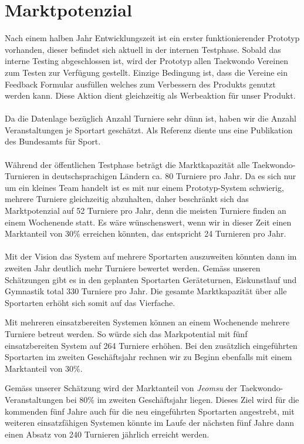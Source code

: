 \section{Marktpotenzial}\label{marktpotenzial}

Nach einem halben Jahr Entwicklungszeit ist ein erster funktionierender Prototyp vorhanden, dieser befindet sich aktuell in
der internen Testphase.
Sobald das interne Testing abgeschlossen ist, wird der Prototyp allen Taekwondo Vereinen zum Testen zur Verfügung gestellt.
Einzige Bedingung ist, dass die Vereine ein Feedback Formular ausfüllen welches zum Verbessern des Produkts genutzt werden kann.
Diese Aktion dient gleichzeitig als Werbeaktion für unser Produkt.
\\\\
Da die Datenlage bezüglich Anzahl Turniere sehr dünn ist, haben wir die Anzahl Veranstaltungen je Sportart geschätzt.
Als Referenz diente uns eine Publikation des Bundesamts für Sport. \parencite[S.~9]{baspo}
\\\\
Während der öffentlichen Testphase beträgt die Marktkapazität alle Taekwondo-Turnieren in deutschsprachigen Ländern
	ca. 80 Turniere pro Jahr.
Da es sich nur um ein kleines Team handelt ist es mit nur einem Prototyp-System schwierig, mehrere Turniere
	gleichzeitig abzuhalten, daher beschränkt sich das Marktpotenzial auf 52 Turniere pro Jahr, denn die meisten
	Turniere finden an einem Wochenende statt.
Es wäre wünschenswert, wenn wir in dieser Zeit einen Marktanteil von 30\% erreichen könnten, das entspricht 24
	Turnieren pro Jahr.
\\\\
Mit der Vision das System auf mehrere Sportarten auszuweiten könnten dann im zweiten Jahr deutlich mehr Turniere bewertet werden.
Gemäss unseren Schätzungen gibt es in den geplanten Sportarten Geräteturnen, Eiskunstlauf und Gymnastik total 330 Turniere pro Jahr.
Die gesamte Marktkapazität über alle Sportarten erhöht sich somit auf das Vierfache.

Mit mehreren einsatzbereiten Systemen können an einem Wochenende mehrere Turniere betreut werden.
So würde sich das Markpotential mit fünf einsatzbereiten System auf 264 Turniere erhöhen.
Bei den zusätzlich eingeführten Sportarten im zweiten Geschäftsjahr rechnen wir zu Beginn ebenfalls mit einem Marktanteil von 30\%.

Gemäss unserer Schätzung wird der Marktanteil von \textit{Jeomsu} der Taekwondo-Veranstaltungen bei 80\% im zweiten Geschäftsjahr liegen.
Dieses Ziel wird für die kommenden fünf Jahre auch für die neu eingeführten Sportarten angestrebt, mit weiteren
	einsatzfähigen Systemen könnte im Laufe der nächsten fünf Jahre dann einen Absatz von 240 Turnieren jährlich
	erreicht werden.


